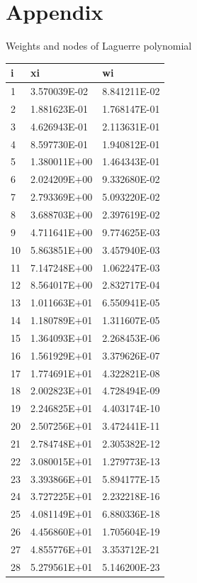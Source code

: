 \documentclass[
10pt, %
a4paper, %
oneside, %
headinclude,footinclude, %
BCOR5mm, %
]{scrartcl}
\theoremstyle{definition}
\begin{document}
\section*{Appendix}
Weights and nodes of Laguerre polynomial\\
\begin{centering}
\begin{tabular}{lll}
\hline
i &xi &wi \\
\hline
1&3.570039E-02&8.841211E-02\\
\hline
2&1.881623E-01&1.768147E-01\\
\hline
3&4.626943E-01&2.113631E-01\\
\hline
4&8.597730E-01&1.940812E-01\\
\hline
5&1.380011E+00&1.464343E-01\\
\hline
6&2.024209E+00&9.332680E-02\\
\hline
7&2.793369E+00&5.093220E-02\\
\hline
8&3.688703E+00&2.397619E-02\\
\hline
9&4.711641E+00&9.774625E-03\\
\hline
10&5.863851E+00&3.457940E-03\\
\hline
11&7.147248E+00&1.062247E-03\\
\hline
12&8.564017E+00&2.832717E-04\\
\hline
13&1.011663E+01&6.550941E-05\\
\hline
14&1.180789E+01&1.311607E-05\\
\hline
15&1.364093E+01&2.268453E-06\\
\hline
16&1.561929E+01&3.379626E-07\\
\hline
17&1.774691E+01&4.322821E-08\\
\hline
18&2.002823E+01&4.728494E-09\\
\hline
19&2.246825E+01&4.403174E-10\\
\hline
20&2.507256E+01&3.472441E-11\\
\hline
21&2.784748E+01&2.305382E-12\\
\hline
22&3.080015E+01&1.279773E-13\\
\hline
23&3.393866E+01&5.894177E-15\\
\hline
24&3.727225E+01&2.232218E-16\\
\hline
25&4.081149E+01&6.880336E-18\\
\hline
26&4.456860E+01&1.705604E-19\\
\hline
27&4.855776E+01&3.353712E-21\\
\hline
28&5.279561E+01&5.146200E-23\\

\end{tabular}
\end{centering}
\end{document}

